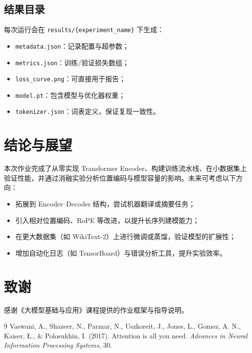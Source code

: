 \documentclass[12pt,a4paper]{article}
\begin{document}
\subsection{结果目录}
每次运行会在 \texttt{results/\{experiment\_name\}} 下生成：
\begin{itemize}
    \item \texttt{metadata.json}：记录配置与超参数；
    \item \texttt{metrics.json}：训练/验证损失数组；
    \item \texttt{loss\_curve.png}：可直接用于报告；
    \item \texttt{model.pt}：包含模型与优化器权重；
    \item \texttt{tokenizer.json}：词表定义，保证复现一致性。
\end{itemize}

\section{结论与展望}
本次作业完成了从零实现 Transformer Encoder、构建训练流水线、在小数据集上验证性能，并通过消融实验分析位置编码与模型容量的影响。未来可考虑以下方向：
\begin{itemize}
    \item 拓展到 Encoder--Decoder 结构，尝试机器翻译或摘要任务；
    \item 引入相对位置编码、RoPE 等改进，以提升长序列建模能力；
    \item 在更大数据集（如 WikiText-2）上进行微调或蒸馏，验证模型的扩展性；
    \item 增加自动化日志（如 TensorBoard）与错误分析工具，提升实验效率。
\end{itemize}

\section*{致谢}
感谢《大模型基础与应用》课程提供的作业框架与指导说明。

\begin{thebibliography}{9}
Vaswani, A., Shazeer, N., Parmar, N., Uszkoreit, J., Jones, L., Gomez, A. N., Kaiser, Ł., \& Polosukhin, I. (2017).
Attention is all you need.
\textit{Advances in Neural Information Processing Systems}, 30.
\end{thebibliography}
\end{document}
